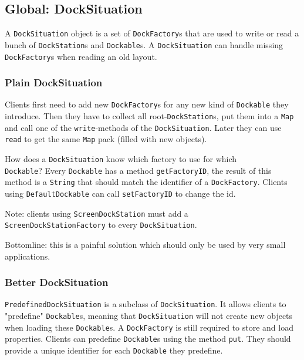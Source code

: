 \documentclass[a4paper,10pt]{article}
\newcommand{\src}[1]{\lstinline[basicstyle=\normalsize\ttfamily,keywordstyle=\normalsize\ttfamily,identifierstyle=\normalsize\ttfamily]|#1|}
\begin{document}
\subsection{Global: DockSituation}
A \src{DockSituation} object is a set of \src{DockFactory}s that are used to write or read a bunch of \src{DockStation}s and \src{Dockable}s. A \src{DockSituation} can handle missing \src{DockFactory}s when reading an old layout.

\subsubsection{Plain DockSituation}
Clients first need to add new \src{DockFactory}s for any new kind of \src{Dockable} they introduce. Then they have to collect all root-\src{DockStation}s, put them into a \src{Map} and call one of the \src{write}-methods of the \src{DockSituation}. Later they can use \src{read} to get the same \src{Map} pack (filled with new objects).

How does a \src{DockSituation} know which factory to use for which \\\src{Dockable}? Every \src{Dockable} has a method \src{getFactoryID}, the result of this method is a \src{String} that should match the identifier of a \src{DockFactory}. Clients using \src{DefaultDockable} can call \src{setFactoryID} to change the id.

Note: clients using \src{ScreenDockStation} must add a \\\src{ScreenDockStationFactory} to every \src{DockSituation}.

Bottomline: this is a painful solution which should only be used by very small applications.

\subsubsection{Better DockSituation}
\src{PredefinedDockSituation} is a subclass of \src{DockSituation}. It allows clients to "predefine" \src{Dockable}s, meaning that \src{DockSituation} will not create new objects when loading these \src{Dockable}s. A \src{DockFactory} is still required to store and load properties. Clients can predefine \src{Dockable}s using the method \src{put}. They should provide a unique identifier for each \src{Dockable} they predefine.
\end{document}
